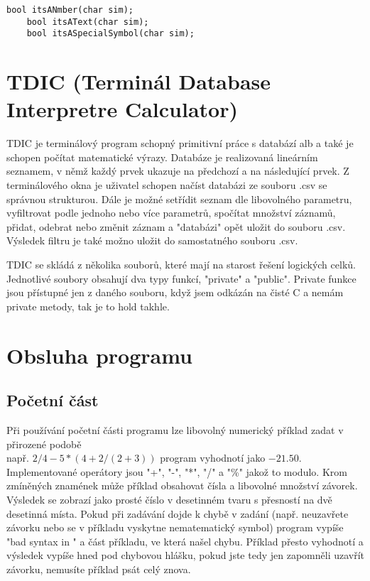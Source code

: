 \documentclass{article}
\begin{document}
\begin{lstlisting}[style=CStyle]
    bool itsANmber(char sim);
    bool itsAText(char sim);
    bool itsASpecialSymbol(char sim);
\end{lstlisting}

\section{TDIC (Terminál Database Interpretre Calculator)}
TDIC je terminálový program schopný primitivní práce s databází alb a také je schopen počítat matematické výrazy.
Databáze je realizovaná lineárním seznamem, v němž každý prvek ukazuje na předchozí a na následující prvek.
Z terminálového okna je uživatel schopen načíst databázi ze souboru .csv se správnou strukturou.
Dále je možné setřídit seznam dle libovolného parametru, vyfiltrovat podle jednoho nebo více parametrů, spočítat množství záznamů, přidat, odebrat nebo změnit záznam a "databázi" opět uložit do souboru .csv.
Výsledek filtru je také možno uložit do samostatného souboru .csv.

TDIC se skládá z několika souborů, které mají na starost řešení logických celků.
Jednotlivé soubory obsahují dva typy funkcí, "private" a "public".
Private funkce jsou přístupné jen z daného souboru, když jsem odkázán na čisté C a nemám private metody, tak je to hold takhle.

\section{Obsluha programu}
\subsection{Početní část}
Při používání početní části programu lze libovolný numerický příklad zadat v přirozené podobě \\např. \(2/4-5*(4+2/(2+3))\) program vyhodnotí jako \(-21.50\).
Implementované operátory jsou "+", "-", "*", "/" a "\%" jakož to modulo.
Krom zmíněných znamének může příklad obsahovat čísla a libovolné množství závorek.
Výsledek se zobrazí jako prosté číslo v desetinném tvaru s přesností na dvě desetinná místa.
Pokud při zadávání dojde k chybě v zadání (např. neuzavřete závorku nebo se v příkladu vyskytne nematematický symbol) program vypíše "bad syntax in " a část příkladu, ve která našel chybu.
Příklad přesto  vyhodnotí a výsledek vypíše hned pod chybovou hlášku, pokud jste tedy jen zapomněli uzavřít závorku, nemusíte příklad psát celý znova.
\end{document}
